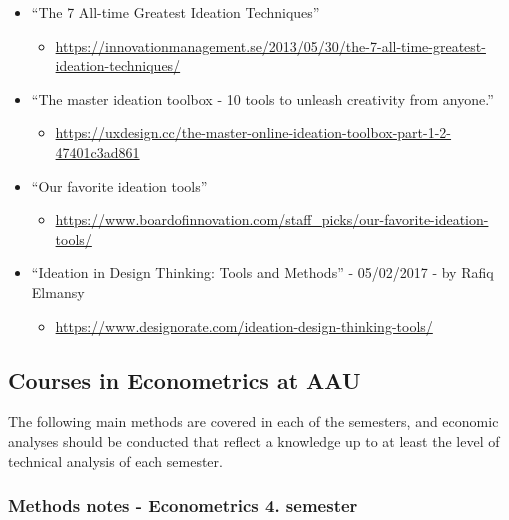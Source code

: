 \documentclass[
]{book}
\providecommand{\tightlist}{%
  \setlength{\itemsep}{0pt}\setlength{\parskip}{0pt}}
\begin{document}
\begin{itemize}
\item
  ``The 7 All-time Greatest Ideation Techniques''

  \begin{itemize}
  \tightlist
  \item
    \url{https://innovationmanagement.se/2013/05/30/the-7-all-time-greatest-ideation-techniques/}
  \end{itemize}
\item
  ``The master ideation toolbox - 10 tools to unleash creativity from
  anyone.''

  \begin{itemize}
  \tightlist
  \item
    \url{https://uxdesign.cc/the-master-online-ideation-toolbox-part-1-2-47401c3ad861}
  \end{itemize}
\item
  ``Our favorite ideation tools''

  \begin{itemize}
  \tightlist
  \item
    \url{https://www.boardofinnovation.com/staff_picks/our-favorite-ideation-tools/}
  \end{itemize}
\item
  ``Ideation in Design Thinking: Tools and Methods'' - 05/02/2017 - by
  Rafiq Elmansy

  \begin{itemize}
  \tightlist
  \item
    \url{https://www.designorate.com/ideation-design-thinking-tools/}
  \end{itemize}
\end{itemize}

\hypertarget{courses-in-econometrics-at-aau}{%
\subsection{Courses in Econometrics at AAU}\label{courses-in-econometrics-at-aau}}

The following main methods are covered in each of the semesters, and economic analyses should be conducted that reflect a knowledge up to at least the level of technical analysis of each semester.

\hypertarget{methods-notes---econometrics-4.-semester}{%
\subsubsection{Methods notes - Econometrics 4. semester}\label{methods-notes---econometrics-4.-semester}}
\end{document}
